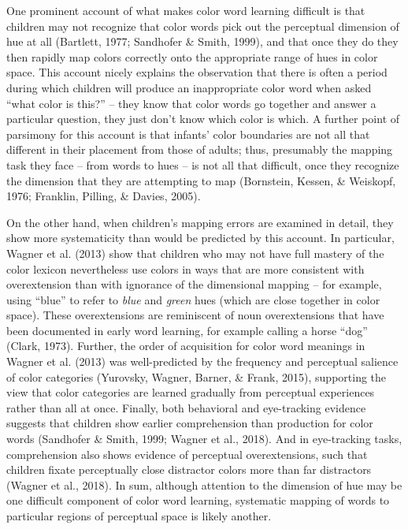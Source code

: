 \documentclass[
  english,
  ,man,floatsintext]{apa6}
\begin{document}
One prominent account of what makes color word learning difficult is that children may not recognize that color words pick out the perceptual dimension of hue at all (Bartlett, 1977; Sandhofer \& Smith, 1999), and that once they do they then rapidly map colors correctly onto the appropriate range of hues in color space. This account nicely explains the observation that there is often a period during which children will produce an inappropriate color word when asked \enquote{what color is this?} -- they know that color words go together and answer a particular question, they just don't know which color is which. A further point of parsimony for this account is that infants' color boundaries are not all that different in their placement from those of adults; thus, presumably the mapping task they face -- from words to hues -- is not all that difficult, once they recognize the dimension that they are attempting to map (Bornstein, Kessen, \& Weiskopf, 1976; Franklin, Pilling, \& Davies, 2005).

On the other hand, when children's mapping errors are examined in detail, they show more systematicity than would be predicted by this account. In particular, Wagner et al. (2013) show that children who may not have full mastery of the color lexicon nevertheless use colors in ways that are more consistent with overextension than with ignorance of the dimensional mapping -- for example, using \enquote{blue} to refer to \emph{blue} and \emph{green} hues (which are close together in color space). These overextensions are reminiscent of noun overextensions that have been documented in early word learning, for example calling a horse \enquote{dog} (Clark, 1973). Further, the order of acquisition for color word meanings in Wagner et al. (2013) was well-predicted by the frequency and perceptual salience of color categories (Yurovsky, Wagner, Barner, \& Frank, 2015), supporting the view that color categories are learned gradually from perceptual experiences rather than all at once. Finally, both behavioral and eye-tracking evidence suggests that children show earlier comprehension than production for color words (Sandhofer \& Smith, 1999; Wagner et al., 2018). And in eye-tracking tasks, comprehension also shows evidence of perceptual overextensions, such that children fixate perceptually close distractor colors more than far distractors (Wagner et al., 2018). In sum, although attention to the dimension of hue may be one difficult component of color word learning, systematic mapping of words to particular regions of perceptual space is likely another.
\end{document}
